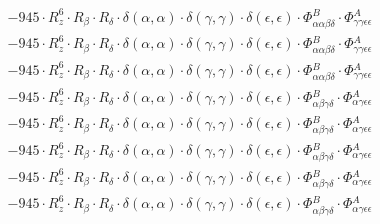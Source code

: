 \documentclass{article}
\begin{document}
\begin{subequations}
\begin{gather}
\begin{array}{c}
 \\[0.2em] 		 - 945 \cdot R_{z}^{6} \cdot R_{\beta{}} \cdot R_{\delta{}} \cdot \delta{}\left(\alpha{}, \alpha{}\right) \cdot \delta{}\left(\gamma{}, \gamma{}\right) \cdot \delta{}\left(\epsilon{}, \epsilon{}\right) \cdot \Phi{}^{B}_{\alpha{}\alpha{}\beta{}\delta{}} \cdot \Phi{}^{A}_{\gamma{}\gamma{}\epsilon{}\epsilon{}} 
 \\[0.2em] 		 - 945 \cdot R_{z}^{6} \cdot R_{\beta{}} \cdot R_{\delta{}} \cdot \delta{}\left(\alpha{}, \alpha{}\right) \cdot \delta{}\left(\gamma{}, \gamma{}\right) \cdot \delta{}\left(\epsilon{}, \epsilon{}\right) \cdot \Phi{}^{B}_{\alpha{}\alpha{}\beta{}\delta{}} \cdot \Phi{}^{A}_{\gamma{}\gamma{}\epsilon{}\epsilon{}} 
 \\[0.2em] 		 - 945 \cdot R_{z}^{6} \cdot R_{\beta{}} \cdot R_{\delta{}} \cdot \delta{}\left(\alpha{}, \alpha{}\right) \cdot \delta{}\left(\gamma{}, \gamma{}\right) \cdot \delta{}\left(\epsilon{}, \epsilon{}\right) \cdot \Phi{}^{B}_{\alpha{}\alpha{}\beta{}\delta{}} \cdot \Phi{}^{A}_{\gamma{}\gamma{}\epsilon{}\epsilon{}} 
 \\[0.2em] 		 - 945 \cdot R_{z}^{6} \cdot R_{\beta{}} \cdot R_{\delta{}} \cdot \delta{}\left(\alpha{}, \alpha{}\right) \cdot \delta{}\left(\gamma{}, \gamma{}\right) \cdot \delta{}\left(\epsilon{}, \epsilon{}\right) \cdot \Phi{}^{B}_{\alpha{}\beta{}\gamma{}\delta{}} \cdot \Phi{}^{A}_{\alpha{}\gamma{}\epsilon{}\epsilon{}} 
 \\[0.2em] 		 - 945 \cdot R_{z}^{6} \cdot R_{\beta{}} \cdot R_{\delta{}} \cdot \delta{}\left(\alpha{}, \alpha{}\right) \cdot \delta{}\left(\gamma{}, \gamma{}\right) \cdot \delta{}\left(\epsilon{}, \epsilon{}\right) \cdot \Phi{}^{B}_{\alpha{}\beta{}\gamma{}\delta{}} \cdot \Phi{}^{A}_{\alpha{}\gamma{}\epsilon{}\epsilon{}} 
 \\[0.2em] 		 - 945 \cdot R_{z}^{6} \cdot R_{\beta{}} \cdot R_{\delta{}} \cdot \delta{}\left(\alpha{}, \alpha{}\right) \cdot \delta{}\left(\gamma{}, \gamma{}\right) \cdot \delta{}\left(\epsilon{}, \epsilon{}\right) \cdot \Phi{}^{B}_{\alpha{}\beta{}\gamma{}\delta{}} \cdot \Phi{}^{A}_{\alpha{}\gamma{}\epsilon{}\epsilon{}} 
 \\[0.2em] 		 - 945 \cdot R_{z}^{6} \cdot R_{\beta{}} \cdot R_{\delta{}} \cdot \delta{}\left(\alpha{}, \alpha{}\right) \cdot \delta{}\left(\gamma{}, \gamma{}\right) \cdot \delta{}\left(\epsilon{}, \epsilon{}\right) \cdot \Phi{}^{B}_{\alpha{}\beta{}\gamma{}\delta{}} \cdot \Phi{}^{A}_{\alpha{}\gamma{}\epsilon{}\epsilon{}} 
 \\[0.2em] 		 - 945 \cdot R_{z}^{6} \cdot R_{\beta{}} \cdot R_{\delta{}} \cdot \delta{}\left(\alpha{}, \alpha{}\right) \cdot \delta{}\left(\gamma{}, \gamma{}\right) \cdot \delta{}\left(\epsilon{}, \epsilon{}\right) \cdot \Phi{}^{B}_{\alpha{}\beta{}\gamma{}\delta{}} \cdot \Phi{}^{A}_{\alpha{}\gamma{}\epsilon{}\epsilon{}} 

\end{array}
\end{gather}
\end{subequations}
\end{document}
